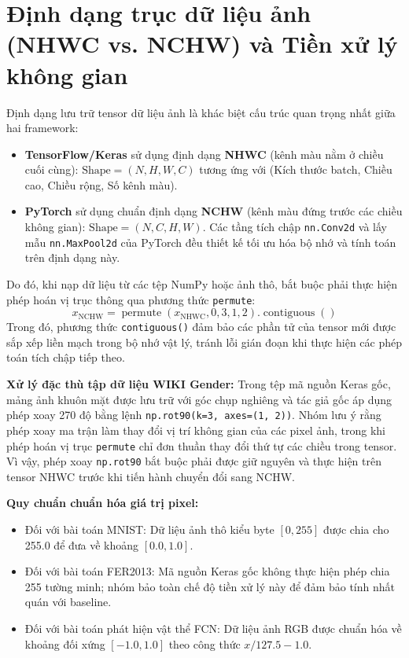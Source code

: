 \section{Định dạng trục dữ liệu ảnh (NHWC vs. NCHW) và Tiền xử lý không gian}
Định dạng lưu trữ tensor dữ liệu ảnh là khác biệt cấu trúc quan trọng nhất giữa hai framework:
\begin{itemize}
\item \textbf{TensorFlow/Keras} sử dụng định dạng \textbf{NHWC} (kênh màu nằm ở chiều cuối cùng): $\text{Shape} = (N, H, W, C)$ tương ứng với (Kích thước batch, Chiều cao, Chiều rộng, Số kênh màu).
\item \textbf{PyTorch} sử dụng chuẩn định dạng \textbf{NCHW} (kênh màu đứng trước các chiều không gian): $\text{Shape} = (N, C, H, W)$. Các tầng tích chập \texttt{nn.Conv2d} và lấy mẫu \texttt{nn.MaxPool2d} của PyTorch đều thiết kế tối ưu hóa bộ nhớ và tính toán trên định dạng này.
\end{itemize}

Do đó, khi nạp dữ liệu từ các tệp NumPy hoặc ảnh thô, bắt buộc phải thực hiện phép hoán vị trục thông qua phương thức \texttt{permute}:
\[
x_{\text{NCHW}} = \operatorname{permute}(x_{\text{NHWC}}, 0, 3, 1, 2).\operatorname{contiguous}()
\]
Trong đó, phương thức \texttt{contiguous()} đảm bảo các phần tử của tensor mới được sắp xếp liền mạch trong bộ nhớ vật lý, tránh lỗi gián đoạn khi thực hiện các phép toán tích chập tiếp theo.

\textbf{Xử lý đặc thù tập dữ liệu WIKI Gender:} Trong tệp mã nguồn Keras gốc, mảng ảnh khuôn mặt được lưu trữ với góc chụp nghiêng và tác giả gốc áp dụng phép xoay 270 độ bằng lệnh \texttt{np.rot90(k=3, axes=(1, 2))}. Nhóm lưu ý rằng phép xoay ma trận làm thay đổi vị trí không gian của các pixel ảnh, trong khi phép hoán vị trục \texttt{permute} chỉ đơn thuần thay đổi thứ tự các chiều trong tensor. Vì vậy, phép xoay \texttt{np.rot90} bắt buộc phải được giữ nguyên và thực hiện trên tensor NHWC trước khi tiến hành chuyển đổi sang NCHW.

\textbf{Quy chuẩn chuẩn hóa giá trị pixel:}
\begin{itemize}
\item Đối với bài toán MNIST: Dữ liệu ảnh thô kiểu byte $[0, 255]$ được chia cho 255.0 để đưa về khoảng $[0.0, 1.0]$.
\item Đối với bài toán FER2013: Mã nguồn Keras gốc không thực hiện phép chia 255 tường minh; nhóm bảo toàn chế độ tiền xử lý này để đảm bảo tính nhất quán với baseline.
\item Đối với bài toán phát hiện vật thể FCN: Dữ liệu ảnh RGB được chuẩn hóa về khoảng đối xứng $[-1.0, 1.0]$ theo công thức $x / 127.5 - 1.0$.
\end{itemize}

